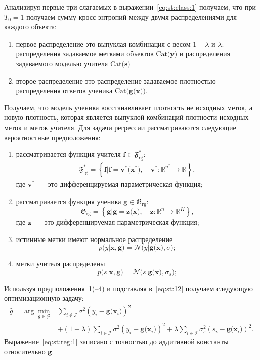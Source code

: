 Анализируя первые три слагаемых в выражении~\eqref{eq:st:class:1} получаем, что при $T_0 = 1$ получаем сумму кросс энтропий между двумя распределениями для каждого объекта:
\begin{enumerate}
	\item первое распределение это выпуклая комбинация с весом $1-\lambda$ и $\lambda$: распределения задаваемое метками объектов $\text{Cat}\bigr(\mathbf{y}\bigr)$ и распределения задаваемого моделью учителя $\text{Cat}\bigr(\mathbf{s}\bigr)$
	\item второе распределение это распределение задаваемое плотностью распределения ответов ученика $\text{Cat}\bigr(\mathbf{g}\bigr(\mathbf{x}\bigr)\bigr)$.
\end{enumerate}
Получаем, что модель ученика восстанавливает плотность не исходных меток, а новую плотность, которая является выпуклой комбинаций плотности исходных меток и меток учителя.
Для задачи регрессии рассматриваются следующие вероятностные предположения:
\begin{enumerate}
	\item рассматривается функция учителя $\mathbf{f}\in\mathfrak{F}_{\text{rg}}^{*}$:
	\[
	\label{eq:F:set:priv}
	\begin{aligned}
	\mathfrak{F}_{\text{rg}}^* = \left\{\mathbf{f}| \mathbf{f} = \mathbf{v}^*\bigr(\mathbf{x}^*\bigr), \quad \mathbf{v}^*: \mathbb{R}^{n^*} \to \mathbb{R} \right\},
	\end{aligned}
	\]
	где $\mathbf{v}^*$~--- это дифференцируемая параметрическая функция;
	\item рассматривается функция ученика $\mathbf{g}\in\mathfrak{G}_{\text{rg}}$:
\[
\label{eq:G:set:rg}
\mathfrak{G}_{\text{rg}} = \left\{\mathbf{g}| \mathbf{g} = \mathbf{z}\bigr(\mathbf{x}\bigr), \quad \mathbf{z}: \mathbb{R}^n \to \mathbb{R}^K \right\},
\]
где $\mathbf{z}$~--- это дифференцируемая параметрическая функция;
	\item истинные метки имеют нормальное распределение
	\[
		p\bigr(y|\mathbf{x}, \mathbf{g}\bigr) = \mathcal{N}\bigr(y|\mathbf{g}\bigr(\mathbf{x}\bigr), \sigma\bigr);
	\]
	\item метки учителя распределены
	\[
		p\bigr(s| \mathbf{x}, \mathbf{g}\bigr) = \mathcal{N}\bigr(s|\mathbf{g}\bigr(\mathbf{x}\bigr), \sigma_s\bigr);
	\]
\end{enumerate}

Используя предположения~1)--4) и подставляя в~\eqref{eq:st:12} получаем следующую оптимизационную задачу:
\[
\label{eq:st:reg:1}
\begin{aligned}
\hat{g} = \arg\min_{g\in \mathcal{G}} & \sum_{i\not\in \mathcal{I}}\sigma^2\left(y_i-\mathbf{g}\bigr(\mathbf{x}_i\bigr)\right)^2 \\
&+ \left(1-\lambda\right)\sum_{i\in \mathcal{I}}\sigma^2\left(y_i-\mathbf{g}\bigr(\mathbf{x}_i\bigr)\right)^2 + \lambda\sum_{i\in \mathcal{I}}\sigma_s^2\left(s_i-\mathbf{g}\bigr(\mathbf{x}_i\bigr)\right)^2.
\end{aligned}
\]
Выражение~\eqref{eq:st:reg:1} записано с точностью до аддитивной константы относительно $\mathbf{g}$. 

